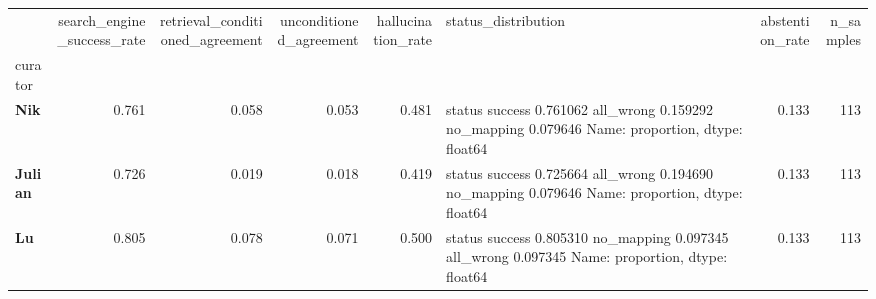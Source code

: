\begin{tabular}{lrrrrlrr}
\toprule
 & search_engine_success_rate & retrieval_conditioned_agreement & unconditioned_agreement & hallucination_rate & status_distribution & abstention_rate & n_samples \\
curator &  &  &  &  &  &  &  \\
\midrule
\textbf{Nik} & 0.761 & 0.058 & 0.053 & 0.481 & status
success       0.761062
all_wrong     0.159292
no_mapping    0.079646
Name: proportion, dtype: float64 & 0.133 & 113 \\
\textbf{Julian} & 0.726 & 0.019 & 0.018 & 0.419 & status
success       0.725664
all_wrong     0.194690
no_mapping    0.079646
Name: proportion, dtype: float64 & 0.133 & 113 \\
\textbf{Lu} & 0.805 & 0.078 & 0.071 & 0.500 & status
success       0.805310
no_mapping    0.097345
all_wrong     0.097345
Name: proportion, dtype: float64 & 0.133 & 113 \\
\bottomrule
\end{tabular}
